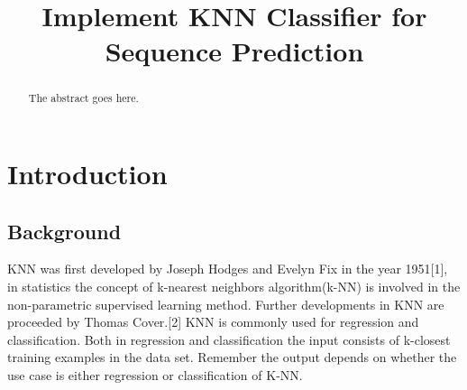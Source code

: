 \documentclass[conference]{IEEEtran}
\begin{document}
%
\title{Implement KNN Classifier for Sequence Prediction}


\author{
\and
{}
}




\maketitle

\begin{abstract}
The abstract goes here.
\end{abstract}



\IEEEpeerreviewmaketitle



\section{Introduction}

\subsection{Background}
KNN was first developed by Joseph Hodges and Evelyn Fix in the year 1951[1], in statistics the concept of k-nearest neighbors algorithm(k-NN) is involved in the non-parametric supervised learning method. Further developments in KNN are proceeded by Thomas Cover.[2]  KNN is commonly used for regression and classification. Both in regression and classification the input consists of k-closest training examples in the data set. Remember the output depends on whether the use case is either regression or classification of K-NN. 
\end{document}
